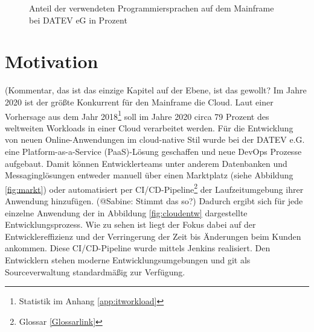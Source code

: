 \begin{figure}
\centering
\caption{Anteil der verwendeten Programmiersprachen auf dem Mainframe bei DATEV eG in Prozent}
\label{fig:Programmiersprachen}
\end{figure}

\section{Motivation}\label{sec:mot}
(Kommentar, das ist das einzige Kapitel auf der Ebene, ist das gewollt?
Im Jahre 2020 ist der größte Konkurrent für den Mainframe die Cloud.
Laut einer Vorhersage aus dem Jahr 2018\footnote{Statistik im Anhang \ref{app:itworkload}} soll im Jahre 2020 circa 79 Prozent des weltweiten Workloads in einer Cloud verarbeitet werden.
Für die Entwicklung von neuen Online-Anwendungen im cloud-native Stil wurde bei der DATEV e.G. eine Platform-as-a-Service (PaaS)-Lösung geschaffen und neue DevOps Prozesse aufgebaut. 
Damit können Entwicklerteams unter anderem Datenbanken und Messaginglösungen entweder manuell über einen Marktplatz (siehe Abbildung \ref{fig:markt}) oder automatisiert per CI/CD-Pipeline\footnote{Glossar \ref{Glossarlink}} der Laufzeitumgebung ihrer Anwendung hinzufügen. (@Sabine: Stimmt das so?)
Dadurch ergibt sich für jede einzelne Anwendung der in Abbildung \ref{fig:cloudentw} dargestellte Entwicklungsprozess.
Wie zu sehen ist liegt der Fokus dabei auf der Entwicklereffizienz und der Verringerung der Zeit bis Änderungen beim Kunden ankommen.
Diese CI/CD-Pipeline wurde mittels Jenkins realisiert.
Den Entwicklern stehen moderne Entwicklungsumgebungen und git als Sourceverwaltung standardmäßig zur Verfügung.


